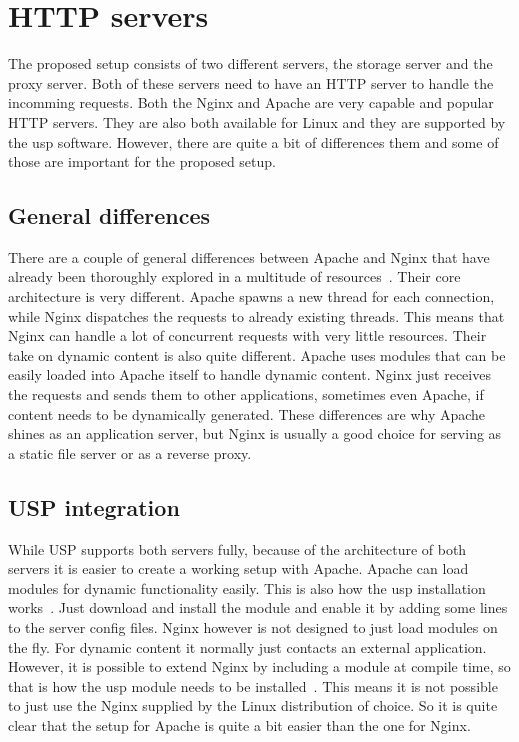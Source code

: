 \documentclass[twoside,openright]{uva-bachelor-thesis}
\begin{document}
\section{HTTP servers}
The proposed setup consists of two different servers, the storage server and the
proxy server. Both of these servers need to have an HTTP server to handle the
incomming requests. Both the Nginx and Apache are very capable and popular HTTP
servers. They are also both available for Linux and they are supported by the
\gls{usp} software. However, there are quite a bit of differences them and some
of those are important for the proposed setup.


\subsection{General differences}
There are a couple of general differences between Apache and Nginx that have
already been thoroughly explored in a multitude of
resources~\autocites{nginx1}{nginx2}{apachevsnginx}{nginxperformancescale}.
Their core architecture is very different. Apache spawns a new thread for each
connection, while Nginx dispatches the requests to already existing threads.
This means that Nginx can handle a lot of concurrent requests with very little
resources. Their take on dynamic content is also quite different. Apache uses
modules that can be easily loaded into Apache itself to handle dynamic content.
Nginx just receives the requests and sends them to other applications, sometimes
even Apache, if content needs to be dynamically generated. These differences are
why Apache shines as an application server, but Nginx is usually a good choice
for serving as a static file server or as a reverse proxy.


\subsection{USP integration}
While USP supports both servers fully, because of the architecture of both
servers it is easier to create a working setup with Apache. Apache can load
modules for dynamic functionality easily. This is also how the \gls{usp}
installation works~\autocite{uspapache}. Just download and install the module
and enable it by adding some lines to the server config files. Nginx however is
not designed to just load modules on the fly. For dynamic content it normally
just contacts an external application. However, it is possible to extend Nginx
by including a module at compile time, so that is how the \gls{usp} module
needs to be installed~\autocite{uspnginx}. This means it is not possible to just
use the Nginx supplied by the Linux distribution of choice. So it is quite clear
that the setup for Apache is quite a bit easier than the one for Nginx.
\end{document}
